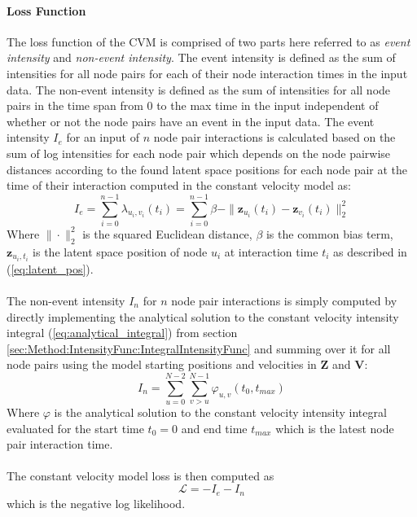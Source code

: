 \paragraph{Loss Function}
The loss function of the CVM is comprised of two parts here referred to as \textit{event intensity} and \textit{non-event intensity}. 
The event intensity is defined as the sum of intensities for all node pairs for each of their node interaction times in the input data. 
The non-event intensity is defined as the sum of intensities for all node pairs in the time span from 0 to the max time in the input independent of whether or not the node pairs have an event in the input data. 
The event intensity $I_e$ for an input of $n$ node pair interactions is calculated based on the sum of log intensities for each node pair which depends on the node pairwise distances according to the found latent space positions for each node pair at the time of their interaction computed in the constant velocity model as:
\begin{equation}
    I_e = \sum_{i = 0}^{n-1}  \lambda_{u_i , v_i}(t_i) =  \sum_{i =0}^{n-1} \beta - \rVert \textbf{z}_{u_i}(t_i) - \textbf{z}_{v_i}(t_i) \rVert_2^2
    \label{eq:Method:ProposedModel:event_intensity_calc}
\end{equation}
Where $\rVert \cdot \rVert_2^2$ is the squared Euclidean distance, $\beta$ is the common bias term, $\textbf{z}_{u_i , t_i}$ is the latent space position of node $u_i$ at interaction time $t_i$ as described in (\ref{eq:latent_pos}).
\\\\
The non-event intensity $I_n$ for $n$ node pair interactions is simply computed by directly implementing the analytical solution to the constant velocity intensity integral (\ref{eq:analytical_integral}) from section \ref{sec:Method:IntensityFunc:IntegralIntensityFunc} and summing over it for all node pairs using the model starting positions and velocities in $\textbf{Z}$ and $\textbf{V}$:
\begin{equation}
    I_n = \sum_{u=0}^{N-2} \sum_{v > u}^{N-1} \varphi_{u,v}(t_0,t_{max}) 
    \label{eq:Method:ProposedModel:nonevent_intensity_calc}
\end{equation}
Where $\varphi$ is the analytical solution to the constant velocity intensity integral evaluated for the start time $t_0=0$ and end time $t_{max}$ which is the latest node pair interaction time.
\\\\
The constant velocity model loss is then computed as
$$
\mathcal{L} = - I_e - I_n
$$
which is the negative log likelihood.

